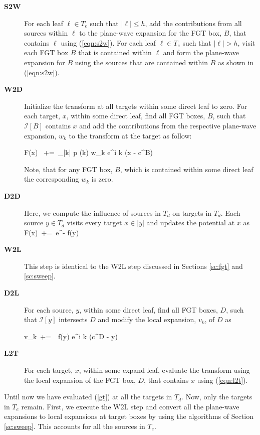 \begin{description}
\item[\textbf{S2W}] For each leaf $\ell \in T_e$ such that $|\ell| \leq h$, add the contributions from all sources within $\ell$
to the plane-wave expansion for the FGT box, $B$, that contains $\ell$ using (\ref{eqn:s2w}). For each leaf $\ell \in T_e$ such that $|\ell| > h$,
visit each FGT box $B$ that is contained within $\ell$ and form the plane-wave expansion for $B$ using the sources that are contained within $B$
as shown in (\ref{eqn:s2w}).

\item[\textbf{W2D}] Initialize the transform at all targets within some direct leaf to zero. For
 each target, $x$, within some direct leaf, find all FGT boxes, $B$, such that $\mathcal{I}[B]$ contains $x$ and
 add the contributions from the respective plane-wave expansion, $w_k$ to the transform at the target as follow: 

\beq F(x) \, +=\, \sum_{|k| \leq p} (k)  w_k e^{i \lambda k \cdot (x - c^B)} \label{eqn:w2d} \eeq

Note, that for any FGT box, $B$, which is contained within some direct leaf the corresponding $w_k$ is zero.

\item[\textbf{D2D}] Here, we compute the influence of sources in $T_d$ on targets in $T_d$. Each source $y \in T_d$ visits 
every target $x \in \mathcal[y]$ and updates the potential at $x$ as 
%  
\beq F(x) \,+=\, e^{-} f(y) \label{eqn:d2d} \eeq
%

\item[\textbf{W2L}] This step is identical to the W2L step discussed in Sections \ref{sc:fgt} and \ref{sc:sweep}.

\item[\textbf{D2L}] For each source, $y$, within some direct leaf, find all FGT boxes, $D$, such that $\mathcal{I}[y]$ intersects $D$ and
modify the local expansion, $v_k$, of $D$ as 

\beq v_k  \,+=\, \, f(y) e^{i \lambda k \cdot (c^D - y)} \label{eqn:d2l} \eeq

\item[\textbf{L2T}] For each target, $x$, within some expand leaf, evaluate the transform using the local 
expansion of the FGT box, $D$, that contains $x$ using (\ref{eqn:l2t}).

\end{description}
   
Until now we have evaluated (\ref{gt}) at all the targets in $T_d$. Now, only the targets in $T_e$ remain. First, we execute
 the W2L step and convert all the plane-wave expansions to local expansions at target boxes by using the algorithms of 
 Section \ref{sc:sweep}. This accounts for all the sources in $T_e$. 

